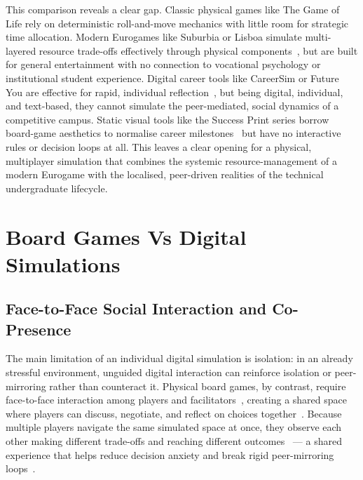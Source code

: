 This comparison reveals a clear gap. Classic physical games like The Game of Life rely on deterministic roll-and-move mechanics with little room for strategic time allocation. Modern Eurogames like Suburbia or Lisboa simulate multi-layered resource trade-offs effectively through physical components~\cite{Sousa-2021}, but are built for general entertainment with no connection to vocational psychology or institutional student experience. Digital career tools like CareerSim or Future You are effective for rapid, individual reflection~\cite{Du-2024, Pataranutaporn-2024}, but being digital, individual, and text-based, they cannot simulate the peer-mediated, social dynamics of a competitive campus. Static visual tools like the Success Print series borrow board-game aesthetics to normalise career milestones~\cite{SuccessPrint-2024} but have no interactive rules or decision loops at all. This leaves a clear opening for a physical, multiplayer simulation that combines the systemic resource-management of a modern Eurogame with the localised, peer-driven realities of the technical undergraduate lifecycle.

\section{Board Games Vs Digital Simulations}

\subsection{Face-to-Face Social Interaction and Co-Presence}

The main limitation of an individual digital simulation is isolation: in an already stressful environment, unguided digital interaction can reinforce isolation or peer-mirroring rather than counteract it. Physical board games, by contrast, require face-to-face interaction among players and facilitators~\cite{Bartolucci-2019, Booth-2019}, creating a shared space where players can discuss, negotiate, and reflect on choices together~\cite{Booth-2019}. Because multiple players navigate the same simulated space at once, they observe each other making different trade-offs and reaching different outcomes~\cite{Bayeck-2020, Booth-2019} --- a shared experience that helps reduce decision anxiety and break rigid peer-mirroring loops~\cite{Booth-2019}.

